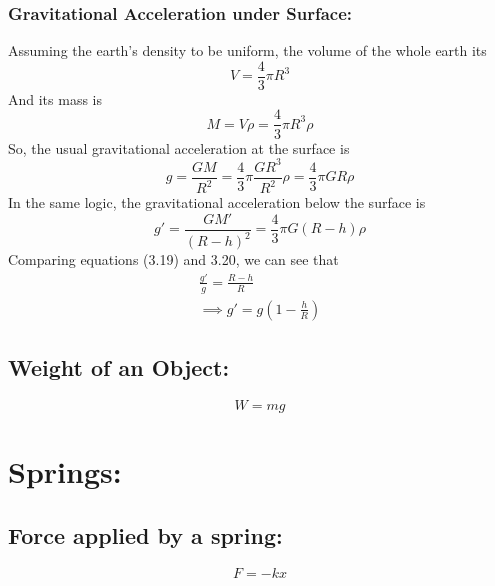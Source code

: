 \documentclass[a4paper]{report}
\begin{document}
            \subsubsection{Gravitational Acceleration under Surface: }
                Assuming the earth's density to be uniform, the volume of the whole earth its
                \begin{equation}
                   V = \frac{4}{3}\pi  R^3
                \end{equation}
                And its mass is
                \begin{equation}
                    M = V\rho = \frac{4}{3}\pi  R^3 \rho
                \end{equation}
                So, the usual gravitational acceleration at the surface is
                \begin{equation}
                    g = \frac{GM}{R^2} = \frac{4}{3}\pi  \frac{GR^3}{R^2} \rho = \frac{4}{3}\pi GR \rho
                \end{equation}
                In the same logic, the gravitational acceleration below the surface is
                \begin{equation}
                    g' = \frac{GM'}{(R-h)^2} = \frac{4}{3}\pi G(R-h) \rho
                \end{equation}
                Comparing equations (3.19) and 3.20, we can see that
                \begin{align}
                    \frac{g'}{g} = \frac{R-h}{R} \nonumber \\
                    \implies g' = g (1 - \frac{h}{R})
                \end{align}
        \subsection{Weight of an Object: }
            \begin{equation}
                W = mg
            \end{equation}
    \section{Springs: }
        \subsection{Force applied by a spring: }
            \begin{equation}
                F = -kx
            \end{equation}
\end{document}
